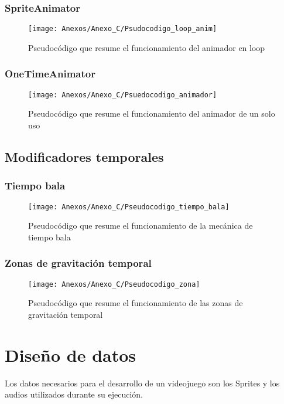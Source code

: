 \subsubsection{SpriteAnimator}

\begin{figure}[h]
\centering
\texttt{[image: Anexos/Anexo\_C/Psudocodigo\_loop\_anim]}
\caption{Pseudocódigo que resume el funcionamiento del animador en loop}
\end{figure}

\subsubsection{OneTimeAnimator}

\begin{figure}[h]
\centering
\texttt{[image: Anexos/Anexo\_C/Psuedocodigo\_animador]}
\caption{Pseudocódigo que resume el funcionamiento del animador de un solo uso}
\end{figure}

\subsection{Modificadores temporales}
\subsubsection{Tiempo bala}

\begin{figure}[h]
\centering
\texttt{[image: Anexos/Anexo\_C/Pseudocodigo\_tiempo\_bala]}
\caption{Pseudocódigo que resume el funcionamiento de la mecánica de tiempo bala}
\end{figure}

\clearpage
\subsubsection{Zonas de gravitación temporal}

\begin{figure}[h]
\centering
\texttt{[image: Anexos/Anexo\_C/Pseudocodigo\_zona]}
\caption{Pseudocódigo que resume el funcionamiento de las zonas de gravitación temporal}
\end{figure}

\section{Diseño de datos}
Los datos necesarios para el desarrollo de un videojuego son los Sprites y los audios utilizados durante su ejecución.

